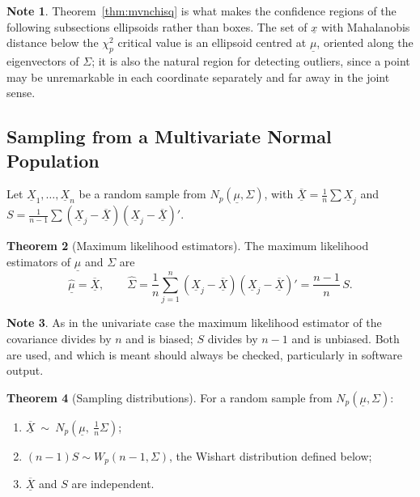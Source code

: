 \documentclass[11pt,a4paper]{article}
\theoremstyle{definition}
\newtheorem{thm}{Theorem}[section]
\newtheorem{note}[thm]{Note}
\begin{document}
\begin{note}
Theorem~\ref{thm:mvnchisq} is what makes the confidence regions of the following
subsections ellipsoids rather than boxes. The set of $\underline{x}$ with
Mahalanobis distance below the $\chi^{2}_{p}$ critical value is an ellipsoid
centred at $\underline{\mu}$, oriented along the eigenvectors of $\Sigma$; it is
also the natural region for detecting outliers, since a point may be
unremarkable in each coordinate separately and far away in the joint sense.
\end{note}

\subsection{Sampling from a Multivariate Normal Population}

Let $\underline{X}_1,\dots,\underline{X}_n$ be a random sample from
$N_p(\underline{\mu},\Sigma)$, with
$\overline{\underline{X}} = \frac{1}{n}\sum\underline{X}_j$ and
$S = \frac{1}{n-1}\sum\left(\underline{X}_j-\overline{\underline{X}}\right)
\left(\underline{X}_j-\overline{\underline{X}}\right)'$.

\begin{thm}[Maximum likelihood estimators]
The maximum likelihood estimators of $\underline{\mu}$ and $\Sigma$ are
$$\widehat{\underline{\mu}} = \overline{\underline{X}},
\qquad
\widehat{\Sigma} = \frac{1}{n}\sum^{n}_{j=1}
\left(\underline{X}_j-\overline{\underline{X}}\right)
\left(\underline{X}_j-\overline{\underline{X}}\right)'
= \frac{n-1}{n}\,S .$$
\end{thm}

\begin{note}
As in the univariate case the maximum likelihood estimator of the covariance
divides by $n$ and is biased; $S$ divides by $n-1$ and is unbiased. Both are
used, and which is meant should always be checked, particularly in software
output.
\end{note}

\begin{thm}[Sampling distributions]
\label{thm:sampling}
For a random sample from $N_p(\underline{\mu},\Sigma)$:
\begin{enumerate}
\item[(i)] $\overline{\underline{X}}\ \sim\ N_p\!\left(\underline{\mu},\ \tfrac{1}{n}\Sigma\right)$;
\item[(ii)] $(n-1)S \sim W_p\left(n-1,\Sigma\right)$, the Wishart distribution
defined below;
\item[(iii)] $\overline{\underline{X}}$ and $S$ are independent.
\end{enumerate}
\end{thm}
\end{document}
